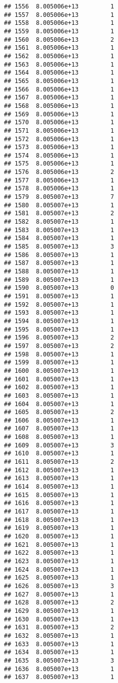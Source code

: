 \documentclass[
]{article}
\begin{document}
\begin{verbatim}
## 1556  8.005006e+13         1
## 1557  8.005006e+13         1
## 1558  8.005006e+13         1
## 1559  8.005006e+13         1
## 1560  8.005006e+13         2
## 1561  8.005006e+13         1
## 1562  8.005006e+13         1
## 1563  8.005006e+13         1
## 1564  8.005006e+13         1
## 1565  8.005006e+13         1
## 1566  8.005006e+13         1
## 1567  8.005006e+13         1
## 1568  8.005006e+13         1
## 1569  8.005006e+13         1
## 1570  8.005006e+13         1
## 1571  8.005006e+13         1
## 1572  8.005006e+13         1
## 1573  8.005006e+13         1
## 1574  8.005006e+13         1
## 1575  8.005006e+13         1
## 1576  8.005006e+13         2
## 1577  8.005006e+13         1
## 1578  8.005006e+13         1
## 1579  8.005007e+13         7
## 1580  8.005007e+13         1
## 1581  8.005007e+13         2
## 1582  8.005007e+13         1
## 1583  8.005007e+13         1
## 1584  8.005007e+13         1
## 1585  8.005007e+13         3
## 1586  8.005007e+13         1
## 1587  8.005007e+13         1
## 1588  8.005007e+13         1
## 1589  8.005007e+13         1
## 1590  8.005007e+13         0
## 1591  8.005007e+13         1
## 1592  8.005007e+13         1
## 1593  8.005007e+13         1
## 1594  8.005007e+13         1
## 1595  8.005007e+13         1
## 1596  8.005007e+13         2
## 1597  8.005007e+13         2
## 1598  8.005007e+13         1
## 1599  8.005007e+13         1
## 1600  8.005007e+13         1
## 1601  8.005007e+13         1
## 1602  8.005007e+13         1
## 1603  8.005007e+13         1
## 1604  8.005007e+13         1
## 1605  8.005007e+13         2
## 1606  8.005007e+13         1
## 1607  8.005007e+13         1
## 1608  8.005007e+13         1
## 1609  8.005007e+13         3
## 1610  8.005007e+13         1
## 1611  8.005007e+13         2
## 1612  8.005007e+13         1
## 1613  8.005007e+13         1
## 1614  8.005007e+13         1
## 1615  8.005007e+13         1
## 1616  8.005007e+13         1
## 1617  8.005007e+13         1
## 1618  8.005007e+13         1
## 1619  8.005007e+13         1
## 1620  8.005007e+13         1
## 1621  8.005007e+13         1
## 1622  8.005007e+13         1
## 1623  8.005007e+13         1
## 1624  8.005007e+13         1
## 1625  8.005007e+13         1
## 1626  8.005007e+13         3
## 1627  8.005007e+13         1
## 1628  8.005007e+13         2
## 1629  8.005007e+13         1
## 1630  8.005007e+13         1
## 1631  8.005007e+13         2
## 1632  8.005007e+13         1
## 1633  8.005007e+13         1
## 1634  8.005007e+13         1
## 1635  8.005007e+13         3
## 1636  8.005007e+13         1
## 1637  8.005007e+13         1

\end{verbatim}
\end{document}
